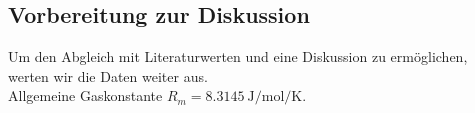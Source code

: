 \subsection{Vorbereitung zur Diskussion}
Um den Abgleich mit Literaturwerten und eine Diskussion zu ermöglichen, werten wir die Daten weiter aus.\\
Allgemeine Gaskonstante $R_m = \SI{8.3145}{\joule\per\mol\per\kelvin}$. \cite{taschenbuch}